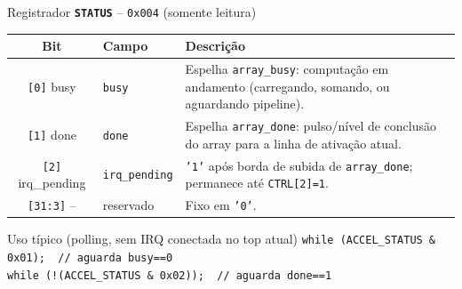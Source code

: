 \documentclass[aspectratio=169,10pt]{beamer}
\newcommand{\bitfield}[2]{\texttt{[#1]} #2}
\newcommand{\regname}[1]{\textbf{\texttt{#1}}}
\begin{document}
\begin{frame}{Registrador \regname{STATUS} -- \texttt{0x004} (somente leitura)}
  \centering

  \vspace{0.5em}
  \small
  \begin{tabular}{clp{8.5cm}}
    \toprule
    \textbf{Bit} & \textbf{Campo} & \textbf{Descrição} \\
    \midrule
    \bitfield{0}{busy} & \texttt{busy} & Espelha \texttt{array\_busy}: computação em andamento (carregando,
      somando, ou aguardando pipeline). \\
    \bitfield{1}{done} & \texttt{done} & Espelha \texttt{array\_done}: pulso/nível de conclusão do array
      para a linha de ativação atual. \\
    \bitfield{2}{irq\_pending} & \texttt{irq\_pending} & \texttt{'1'} após borda de subida de
      \texttt{array\_done}; permanece até \texttt{CTRL[2]=1}. \\
    \bitfield{31:3}{--} & reservado & Fixo em \texttt{'0'}. \\
    \bottomrule
  \end{tabular}

  \vspace{0.5em}
  \begin{block}{Uso típico (polling, sem IRQ conectada no top atual)}
    \small
    \texttt{while (ACCEL\_STATUS \& 0x01);\ \ // aguarda busy==0}\\
    \texttt{while (!(ACCEL\_STATUS \& 0x02));\ \ // aguarda done==1}
  \end{block}
\end{frame}
\end{document}
